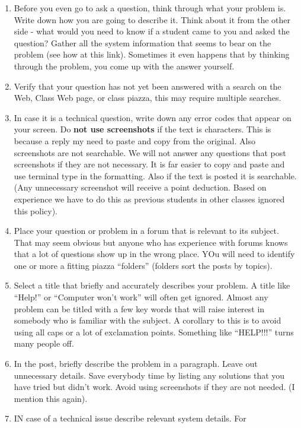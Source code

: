 \begin{enumerate}
\item
  Before you even go to ask a question, think through what your problem
  is. Write down how you are going to describe it. Think about it from
  the other side - what would you need to know if a student came to you
  and asked the question? Gather all the system information that seems
  to bear on the problem (see how at this link). Sometimes it even
  happens that by thinking through the problem, you come up with the
  answer yourself.
\item
  Verify that your question has not yet been answered with a search on
  the Web, Class Web page, or class piazza, this may require multiple
  searches.
\item
  In case it is a technical question, write down any error codes that
  appear on your screen. Do \textbf{not use screenshots} if the text is
  characters. This is because a reply my need to paste and copy from the
  original. Also screenshots are not searchable. We will not answer any
  questions that post screenshots if they are not necessary. It is far
  easier to copy and paste and use terminal type in the formatting. Also
  if the text is posted it is searchable. (Any unnecessary screenshot
  will receive a point deduction. Based on experience we have to do this
  as previous students in other classes ignored this policy).
\item
  Place your question or problem in a forum that is relevant to its
  subject. That may seem obvious but anyone who has experience with
  forums knows that a lot of questions show up in the wrong place. YOu
  will need to identify one or more a fitting piazza ``folders''
  (folders sort the posts by topics).
\item
  Select a title that briefly and accurately describes your problem. A
  title like ``Help!'' or ``Computer won't work'' will often get
  ignored. Almost any problem can be titled with a few key words that
  will raise interest in somebody who is familiar with the subject. A
  corollary to this is to avoid using all caps or a lot of exclamation
  points. Something like ``HELP!!!'' turns many people off.
\item
  In the post, briefly describe the problem in a paragraph. Leave out
  unnecessary details. Save everybody time by listing any solutions that
  you have tried but didn't work. Avoid using screenshots if they are
  not needed. (I mention this again).
\item
  IN case of a technical issue describe relevant system details. For

\end{enumerate}
